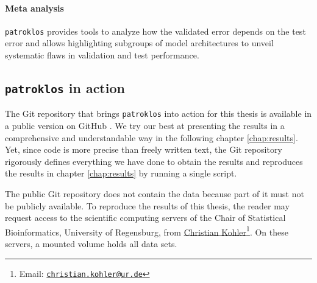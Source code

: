 \paragraph{Meta analysis} 
\texttt{patroklos} provides tools to analyze how the validated error depends on the test error and 
allows highlighting subgroups of model architectures to unveil systematic flaws in validation 
and test performance.

\subsection{\texttt{patroklos} in action}

The Git repository that brings \texttt{patroklos} into action for this thesis is available in a 
public version on GitHub \cite{thesis-gh}. We try our best at presenting the results in a 
comprehensive and understandable way in the following chapter \ref{chap:results}. Yet, since code 
is more precise than freely written text, the Git repository rigorously defines everything we have 
done to obtain the results and reproduces the results in chapter \ref{chap:results} by running 
a single script.

The public Git repository does not contain the data because part of it must not be publicly 
available. To reproduce the results of this thesis, the reader may request access to the scientific 
computing servers of the Chair of Statistical Bioinformatics, University of Regensburg, from 
\href{mailto:christian.kohler@ur.de}{Christian Kohler}\footnote{Email: 
\href{mailto:christian.kohler@ur.de}{\texttt{christian.kohler@ur.de}}}. On these servers, a mounted
volume holds all data sets.